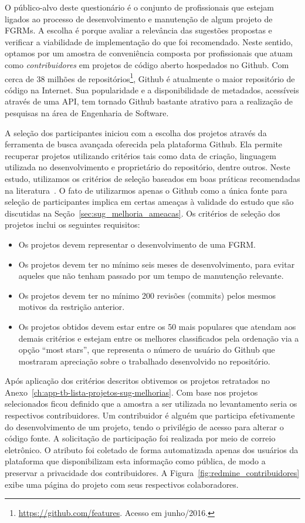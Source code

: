 O público-alvo deste questionário é o conjunto de profissionais que estejam
ligados ao processo de desenvolvimento e manutenção de algum projeto de FGRMs.
A escolha é porque avaliar a relevância das sugestões propostas e verificar a
viabilidade de implementação do que foi recomendado. Neste sentido, optamos por
um amostra de conveniência composta por profissionais que atuam como
\textit{contribuidores} em projetos de código aberto hospedados no Github. Com
cerca de 38 milhões de repositórios\footnote{\url{https://github.com/features}.
    Acesso em junho/2016.}, Github é atualmente o maior repositório de código na
Internet.  Sua popularidade e a disponibilidade de metadados, acessíveis através
de uma API, tem tornado Github bastante atrativo para a realização de pesquisas
na área de Engenharia de Software.

A seleção dos participantes iniciou com a escolha dos projetos através da
ferramenta de busca avançada oferecida pela plataforma Github. Ela permite
recuperar projetos utilizando critérios tais como data de criação, linguagem
utilizada no desenvolvimento e proprietário do repositório, dentre outros. Neste
estudo, utilizamos os critérios de seleção baseados em boas práticas
recomendadas na literatura~\cite{Bird2009}. O fato de utilizarmos apenas o
Github como a única fonte para seleção de participantes implica em certas
ameaças à validade do estudo que são discutidas na
Seção~\ref{sec:sug_melhoria_ameacas}. Os critérios de seleção dos projetos
inclui os seguintes requisitos:

\begin{itemize}
	\item Os projetos devem representar o desenvolvimento de uma FGRM\@.
    \item Os projetos devem ter no mínimo seis meses de desenvolvimento, para
        evitar aqueles que não tenham passado por um tempo de manutenção
        relevante.
	\item Os projetos devem  ter  no  mínimo  200  revisões (commits)  pelos
		mesmos motivos  da restrição anterior.
    \item Os projetos obtidos devem estar entre os 50 mais populares que atendam
        aos demais critérios e estejam entre os melhores classificados pela
        ordenação via a opção ``most stars'', que representa o número de usuário
        do Github que mostraram apreciação sobre o trabalhado desenvolvido no
        repositório.
\end{itemize}

Após aplicação dos critérios descritos obtivemos os projetos retratados no
Anexo~\ref{ch:app-tb-lista-projetos-sug-melhorias}. Com base nos projetos
selecionados ficou definido que a amostra a ser utilizada no levantamento seria
os respectivos contribuidores. Um contribuidor é alguém que participa
efetivamente do desenvolvimento de um projeto, tendo o privilégio de acesso para
alterar o código fonte. A solicitação de participação foi realizada por meio de
correio eletrônico. O atributo foi coletado de forma automatizada apenas dos
usuários da plataforma que disponibilizam esta informação como pública, de modo
a preservar a privacidade dos contribuidores. A
Figura~\ref{fig:redmine_contribuidores} exibe uma página do projeto com seus
respectivos colaboradores.

